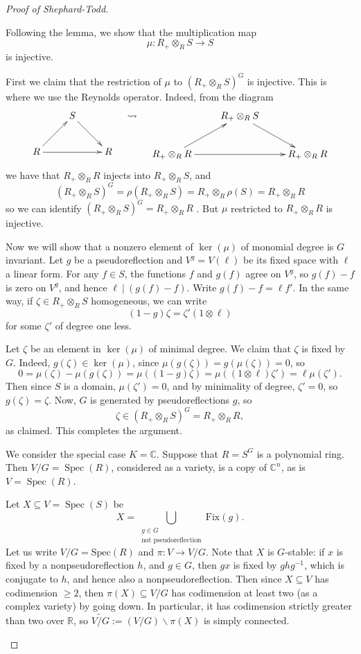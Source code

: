\documentclass[12pt]{amsart}
\theoremstyle{definition}
\numberwithin{equation}{theorem}
\def\ker{\operatorname{ker}}
\def\Spec{\operatorname{Spec}}
\def\CC{\mathbb{C}}
\def\RR{\mathbb{R}}
\def\to{\longrightarrow}
\begin{document}
\begin{proof}[Proof of Shephard-Todd]
\begin{asparaenum}
\item Following the lemma, we show that the multiplication map
\[ \mu: R_+ \otimes_{R} S \to S\]
is injective.

First we claim that the restriction of $\mu$ to $(R_+ \otimes_R S)^G$ is injective. This is where we use the Reynolds operator. Indeed, from the diagram
\[ \xymatrix{ & S \ar[dr] & \\ R \ar[rr] \ar[ur] & & R} \quad \rightsquigarrow \quad \xymatrix{ & R_+ \otimes_R S \ar[dr] & \\ R_+ \otimes_R R \ar[ur] \ar[rr] & & R_+ \otimes_R R}\]
we have that $R_+ \otimes_R R$ injects into $R_+ \otimes_R S$, and
\[ (R_+ \otimes_R S)^G = \rho ( R_+ \otimes_R S ) = R_+ \otimes_R \rho(S) = R_+ \otimes_R R\]
so we can identify $(R_+ \otimes_R S)^G = R_+ \otimes_R R$ . But $\mu$ restricted to $R_+ \otimes_R R$ is injective.

Now we will show that a nonzero element of $\ker(\mu)$ of monomial degree is $G$ invariant.
 Let $g$ be a pseudoreflection and $V^g = V(\ell)$ be its fixed space with $\ell$ a linear form. For any $f\in S$, the functions $f$ and $g(f)$ agree on $V^g$, so $g(f)-f$ is zero on $V^g$, and hence $\ell \ | \ (g(f) - f)$.
Write $g(f) - f = \ell f'$. In the same way, if $\zeta\in R_+ \otimes_{R} S$ homogeneous, we can write
\[ (1-g)\zeta = \zeta' (1\otimes \ell)\]
for some $\zeta'$ of degree one less.

Let $\zeta$ be an element in $\ker(\mu)$ of minimal degree. We claim that $\zeta$ is fixed by $G$. Indeed, $g(\zeta) \in \ker(\mu)$, since $\mu(g(\zeta))=g(\mu(\zeta))=0$, so
\[ 0 = \mu(\zeta) - \mu(g(\zeta)) = \mu((1-g) \zeta) = \mu((1\otimes \ell) \zeta') = \ell \mu(\zeta').\]
Then since $S$ is a domain, $\mu(\zeta')=0$, and by minimality of degree, $\zeta'=0$, so $g(\zeta)=\zeta$. Now, $G$ is generated by pseudoreflections $g$, so 
\[ \zeta \in (R_+ \otimes_R S)^G = R_+ \otimes_R R,\]
as claimed. This completes the argument.


\item 
We consider the special case $K=\CC$.
Suppose that $R=S^G$ is a polynomial ring. Then $V/G=\Spec(R)$, considered as a variety, is a copy of $\CC^n$, as is $V=\Spec(R)$.

Let  $X\subseteq V = \Spec(S)$ be 
\[ X= \bigcup_ {\substack{g\in G\\ \text{not pseudoreflection}}} \mathrm{Fix}(g).\]
Let us write $V/G=\mathrm{Spec}(R)$ and $\pi :  V\to V/G$. Note that $X$ is $G$-stable: if $x$ is fixed by a nonpseudoreflection $h$, and $g\in G$, then $gx$ is fixed by $ghg^{-1}$, which is conjugate to $h$, and hence also a nonpseudoreflection.
 Then since $X\subseteq V$ has codimension $\geq 2$, then $\pi(X) \subseteq V/G$ has codimension at least two (as a complex variety) by going down. In particular, it has codimension strictly greater than two over $\RR$, so $\widetilde{V/G} := (V/G) \smallsetminus \pi(X)$ is simply connected.


\end{asparaenum}
\end{proof}
\end{document}
